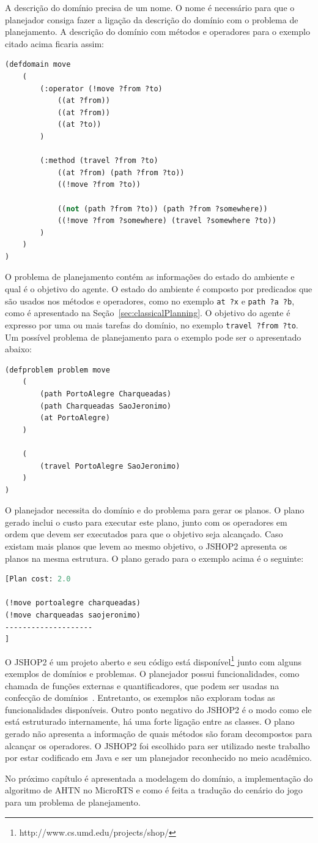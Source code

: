 A descrição do domínio precisa de um nome. 
O nome é necessário para que o planejador consiga fazer a ligação da descrição do domínio com o problema de planejamento. 
A descrição do domínio com métodos e operadores para o exemplo citado acima ficaria assim:

\lstset{style=codeStyle}
\begin{lstlisting}[language=lisp]
(defdomain move
	(	
		(:operator (!move ?from ?to) 
			((at ?from)) 
			((at ?from))
			((at ?to))
		)
		
		(:method (travel ?from ?to)
			((at ?from) (path ?from ?to))
			((!move ?from ?to))
		
			((not (path ?from ?to)) (path ?from ?somewhere))
			((!move ?from ?somewhere) (travel ?somewhere ?to))
		)    
	)
)
\end{lstlisting}

O problema de planejamento contém as informações do estado do ambiente e qual é o objetivo do agente. 
O estado do ambiente é composto por predicados que são usados nos métodos e operadores, como no exemplo \texttt{at ?x} e \texttt{path ?a ?b}, como é apresentado na Seção~\ref{sec:classicalPlanning}.
O objetivo do agente é expresso por uma ou mais tarefas do domínio, no exemplo \texttt{travel ?from ?to}. Um possível problema de planejamento para o exemplo pode ser o apresentado abaixo:


\begin{lstlisting}[language=lisp]
(defproblem problem move
	( 
		(path PortoAlegre Charqueadas)
		(path Charqueadas SaoJeronimo)
		(at PortoAlegre)
	)
	
	(
		(travel PortoAlegre SaoJeronimo)
	)
)
\end{lstlisting}

O planejador necessita do domínio e do problema para gerar os planos.
O plano gerado inclui o custo para executar este plano, junto com os operadores em ordem que devem ser executados para que o objetivo seja alcançado. 
Caso existam mais planos que levem ao mesmo objetivo, o JSHOP2 apresenta os planos na mesma estrutura.
O plano gerado para o exemplo acima é o seguinte:

\begin{lstlisting}[language=lisp]
[Plan cost: 2.0

(!move portoalegre charqueadas)
(!move charqueadas saojeronimo)
--------------------
]
\end{lstlisting}

O JSHOP2 é um projeto aberto e seu código está disponível\footnote{http://www.cs.umd.edu/projects/shop/} junto com alguns exemplos de domínios e problemas.
O planejador possui funcionalidades, como chamada de funções externas e quantificadores, que podem ser usadas na confecção de domínios~\cite{ilghami2006documentation}.
Entretanto, os exemplos não exploram todas as funcionalidades disponíveis.
Outro ponto negativo do JSHOP2 é o modo como ele está estruturado internamente, há uma forte ligação entre as classes.
O plano gerado não apresenta a informação de quais métodos são foram decompostos para alcançar os operadores.
O JSHOP2 foi escolhido para ser utilizado neste trabalho por estar codificado em Java e ser um planejador reconhecido no meio acadêmico.

No próximo capítulo é apresentada a modelagem do domínio, a implementação do algoritmo de AHTN no MicroRTS e como é feita a tradução do cenário do jogo para um problema de planejamento.

